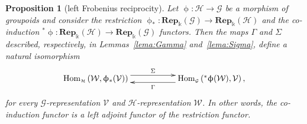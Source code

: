 \documentclass[pdftex]{sigma}
\numberwithin{equation}{section}
\newtheorem{Proposition}[Theorem]{Proposition}
 { \theoremstyle{definition}
\newtheorem{Definition}[Theorem]{Definition}
\newtheorem{Remark}[Theorem]{Remark}
\newtheorem{Example}[Theorem]{Example}
 }
\renewcommand{\hom}[3]{\mathrm{Hom}_{\Sscript{#1}}\left(#2, #3\right)}
\newcommand{\Rep}[1]{\mathbf{Rep}_{\Sscript{\Bbbk}}(#1)}
\newcommand{\cG}{{\mathcal G}}
\newcommand{\cH}{{\mathcal H}}
\newcommand{\cV}{{\mathcal V}}
\newcommand{\cW}{{\mathcal W}}
\newcommand{\Sscript}[1]{\scriptscriptstyle{#1}}
\begin{document}
\begin{Proposition}[left Frobenius reciprocity]\label{prop:FrobeniusL} Let $\upphi\colon \cH \to \cG$ be a morphism of groupoids and consider the restriction $\upphi_{*}\colon \Rep{\cG} \to \Rep{\cH}$ and the co-induction ${}^{*}\upphi\colon \Rep{\cH} \to \Rep{\cG}$ functors. Then the maps $\Gamma$ and $\Sigma$ described, respectively, in Lemmas~{\rm \ref{lema:Gamma}} and~{\rm \ref{lema:Sigma}}, define a natural isomorphism
\begin{gather*}
\xymatrix@R=0pt{ \hom{\cH}{\cW}{\upphi_{*}(\cV)}
\ar@<1ex>@{->}^-{\Sigma}[rr] & & \hom{\cG}{{}^*\upphi(\cW)}{\cV},
\ar@<1ex>@{->}^-{\Gamma}[ll] }
\end{gather*}
for every $\cG$-representation $\cV$ and $\cH$-representation $\cW$. In other words, the co-induction functor is a left adjoint functor of the restriction functor.
\end{Proposition}
\end{document}
